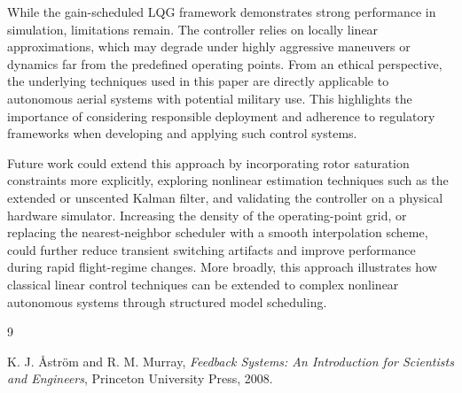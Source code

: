 \documentclass[11pt]{amsart}
\begin{document}
While the gain-scheduled LQG framework demonstrates strong performance in simulation, limitations remain. The controller relies on locally linear approximations, which may degrade under highly aggressive maneuvers or dynamics far from the predefined operating points. From an ethical perspective, the underlying techniques used in this paper are directly applicable to autonomous aerial systems with potential military use. This highlights the importance of considering responsible deployment and adherence to regulatory frameworks when developing and applying such control systems.

Future work could extend this approach by incorporating rotor saturation constraints more explicitly, exploring nonlinear estimation techniques such as the extended or unscented Kalman filter, and validating the controller on a physical hardware simulator. Increasing the density of the operating-point grid, or replacing the nearest-neighbor scheduler with a smooth interpolation scheme, could further reduce transient switching artifacts and improve performance during rapid flight-regime changes. More broadly, this approach illustrates how classical linear control techniques can be extended to complex nonlinear autonomous systems through structured model scheduling.







\FloatBarrier %
\newpage

\begin{thebibliography}{9}

K. J. Åström and R. M. Murray,
\textit{Feedback Systems: An Introduction for Scientists and Engineers},
Princeton University Press, 2008.

\end{thebibliography}

\end{document}
